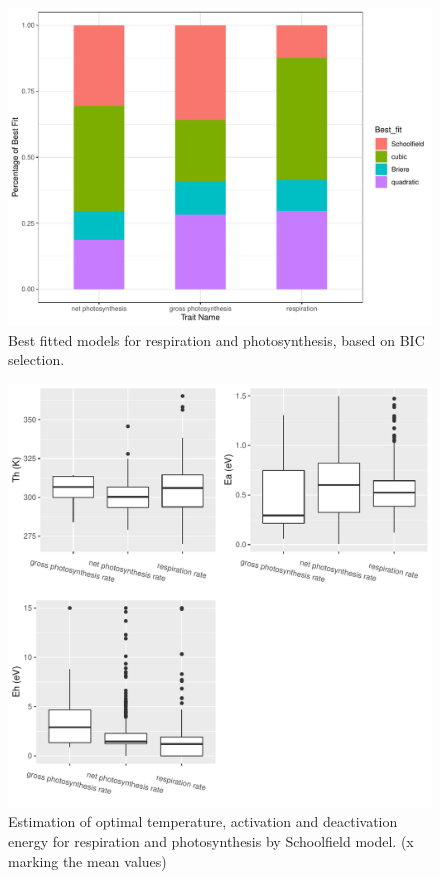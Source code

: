 \documentclass[11pt, a4paper]{article}
\begin{document}
\begin{spacing}{1.5}
\begin{figure}[H]
    \centering
    \includegraphics[scale=0.6]{../results/sub_trait.pdf}
    \caption{Best fitted models for respiration and photosynthesis, based on BIC selection.}
    \label{fig:sub_trait}
\end{figure}

\begin{figure}[H]
    \centering
    \includegraphics[scale=0.6]{../results/traits.pdf}
    \caption{Estimation of optimal temperature, activation and deactivation energy for respiration and photosynthesis by Schoolfield model. (x marking the mean values)}
    \label{fig:traits}
\end{figure}


\end{spacing}
\end{document}
